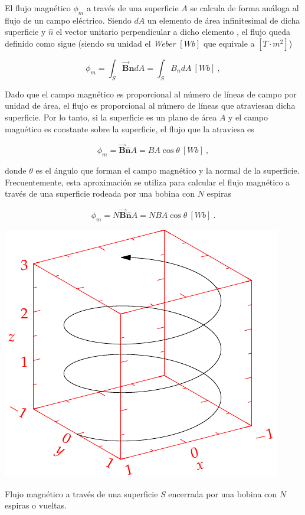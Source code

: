\documentclass{tufte-handout}
\begin{document}
El flujo magnético $\phi_m$ a través de una superficie $A$ se calcula de forma análoga al flujo de un campo eléctrico. Siendo $dA$ un elemento de área infinitesimal de dicha superficie y $\hat{n}$ el vector unitario perpendicular a dicho elemento , el flujo queda definido como sigue (siendo su unidad el \emph{Weber} $[Wb]$ que equivale a $[T\cdot m^2]$)

\begin{equation}
\phi_m = \int_{S} \mathbf{\vec{B}}\mathbf{\hat{n}}dA = \int_{S}B_ndA ~ [Wb]~, 
\end{equation}

Dado que el campo magnético es proporcional al número de líneas de campo por unidad de área, el flujo es proporcional al número de líneas que atraviesan dicha superficie. Por lo tanto, si la superficie es un plano de área $A$ y el campo magnético es constante sobre la superficie, el flujo que la atraviesa es

\begin{equation}
\phi_m = \mathbf{\vec{B}}\mathbf{\hat{n}}A = BA\cos{\theta} ~ [Wb]~,
\end{equation}

donde $\theta$ es el ángulo que forman el campo magnético y la normal de la superficie. Frecuentemente, esta aproximación se utiliza para calcular el flujo magnético a través de una superficie rodeada por una bobina con $N$ espiras

\begin{equation}
\phi_m = N\mathbf{\vec{B}}\mathbf{\hat{n}}A = NBA\cos{\theta} ~ [Wb]~.
\end{equation}

\begin{marginfigure}%
    \includegraphics[width=\linewidth]{helix}
    \caption{Flujo magnético a través de una superficie $S$ encerrada por una bobina con $N$ espiras o vueltas.}
    \label{fig:flujomagneticoespira}
\end{marginfigure}
\end{document}
